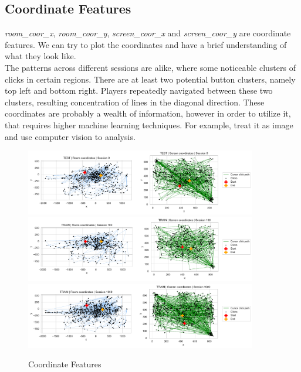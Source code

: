 \documentclass[11pt,a4paper]{article}
\begin{document}
    \subsection{Coordinate Features}
    \textit{room\_coor\_x}, \textit{room\_coor\_y}, \textit{screen\_coor\_x} and \textit{screen\_coor\_y} are coordinate features. We can try to plot the coordinates and have a brief understanding of what they look like. \\
    The patterns across different sessions are alike, where some noticeable clusters of clicks in certain regions. There are at least two potential button clusters, namely top left and bottom right. Players repeatedly navigated between these two clusters, resulting concentration of lines in the diagonal direction. These coordinates are probably a wealth of information, however in order to utilize it, that requires higher machine learning techniques. For example, treat it as image and use computer vision to analysis.
    \begin{figure}[H]
        \centering
        \includegraphics[width = 0.9\textwidth]{EDA_plot/corrdinates_0.pdf}
        \includegraphics[width = 0.9\textwidth]{EDA_plot/corrdinates_100.pdf}
        \includegraphics[width = 0.9\textwidth]{EDA_plot/corrdinates_1000.pdf}
        \caption{Coordinate Features}
        \label{fig:coordinate}
    \end{figure}
\end{document}

